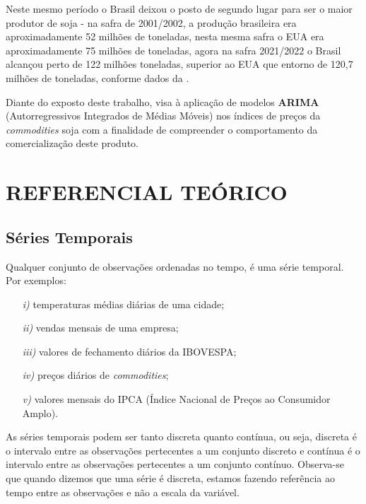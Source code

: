 \documentclass[
	12pt,				%
	openright,			%
	oneside,      %
	a4paper,			%
	english,			%
	french,				%
	spanish,			%
	brazil,				%
	]{abntex2}\usepackage[]{graphicx}\usepackage[]{xcolor}
\begin{document}
Neste mesmo período o Brasil deixou o posto de segundo lugar para ser o maior produtor de soja - na safra de 2001/2002, a produção brasileira era aproximadamente 52 milhões de toneladas, nesta mesma safra o EUA era aproximadamente 75 milhões de toneladas, agora na safra 2021/2022 o Brasil alcançou perto de 122 milhões toneladas, superior ao EUA que entorno de 120,7 milhões de toneladas, conforme dados da \cite{conab2022}.





Diante do exposto deste trabalho, visa à aplicação de modelos \textbf{ARIMA} (Autorregressivos Integrados de Médias Móveis) nos índices de preços da \textit{commodities} soja com a finalidade de compreender o comportamento da 
comercialização deste produto.


\chapter{REFERENCIAL TEÓRICO}


  \section{Séries Temporais}
  
Qualquer conjunto de observações ordenadas no tempo, é uma série temporal. Por exemplos:

\begin{itemize}
  \item[\textit{i)}] temperaturas médias diárias de uma cidade;
  \item[\textit{ii)}] vendas mensais de uma empresa;
  \item[\textit{iii)}] valores de fechamento diários da IBOVESPA;
  \item[\textit{iv)}] preços diários de \textit{commodities};
  \item[\textit{v)}] valores mensais do IPCA (Índice Nacional de Preços ao Consumidor Amplo).
\end{itemize}

As séries temporais podem ser tanto discreta quanto contínua, ou seja, discreta é o 
intervalo entre as observações pertecentes a um conjunto discreto e contínua é o 
intervalo entre as observações pertecentes a um conjunto contínuo. Observa-se que 
quando dizemos que uma série é discreta, estamos fazendo referência ao tempo entre as 
observações e não a escala da variável.
\end{document}
